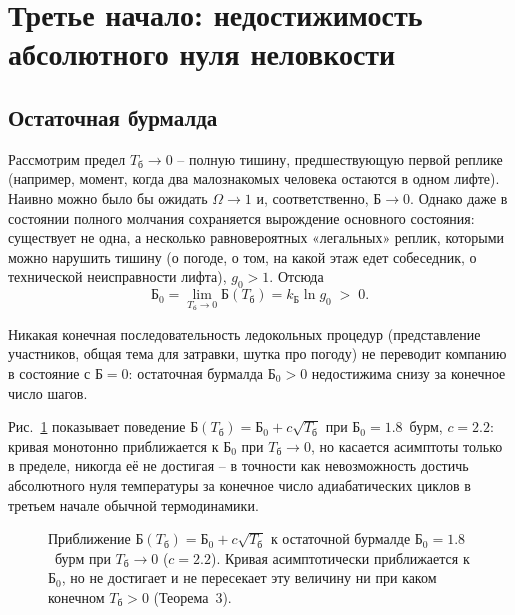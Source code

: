 \documentclass[11pt,a4paper]{article}
\newcommand{\Burm}{\text{Б}}
\newcommand{\kB}{k_{\text{Б}}}
\newcommand{\Tb}{T_{\text{б}}}
\begin{document}
\section{Третье начало: недостижимость абсолютного нуля неловкости}

\subsection{Остаточная бурмалда}

Рассмотрим предел $\Tb\to0$ -- полную тишину, предшествующую первой реплике (например, момент, когда два малознакомых человека остаются в одном лифте). Наивно можно было бы ожидать $\Omega\to1$ и, соответственно, $\Burm\to0$. Однако даже в состоянии полного молчания сохраняется вырождение основного состояния: существует не одна, а несколько равновероятных «легальных» реплик, которыми можно нарушить тишину (о погоде, о том, на какой этаж едет собеседник, о технической неисправности лифта), $g_0>1$. Отсюда
\[
\Burm_0 = \lim_{\Tb\to0}\Burm(\Tb) = \kB \ln g_0 \;>\; 0.
\]

\begin{theorem}
Никакая конечная последовательность ледокольных процедур (представление участников, общая тема для затравки, шутка про погоду) не переводит компанию в состояние с $\Burm=0$: остаточная бурмалда $\Burm_0>0$ недостижима снизу за конечное число шагов.
\end{theorem}

Рис.~\ref{fig:third-law} показывает поведение $\Burm(\Tb)=\Burm_0+c\sqrt{\Tb}$ при $\Burm_0=1.8$~бурм, $c=2.2$: кривая монотонно приближается к $\Burm_0$ при $\Tb\to0$, но касается асимптоты только в пределе, никогда её не достигая -- в точности как невозможность достичь абсолютного нуля температуры за конечное число адиабатических циклов в третьем начале обычной термодинамики.

\begin{figure}[htbp]
\centering
{}
\caption{Приближение $\Burm(\Tb)=\Burm_0+c\sqrt{\Tb}$ к остаточной бурмалде $\Burm_0=1.8$~бурм при $\Tb\to0$ ($c=2.2$). Кривая асимптотически приближается к $\Burm_0$, но не достигает и не пересекает эту величину ни при каком конечном $\Tb>0$ (Теорема~3).}
\label{fig:third-law}
\end{figure}
\end{document}
